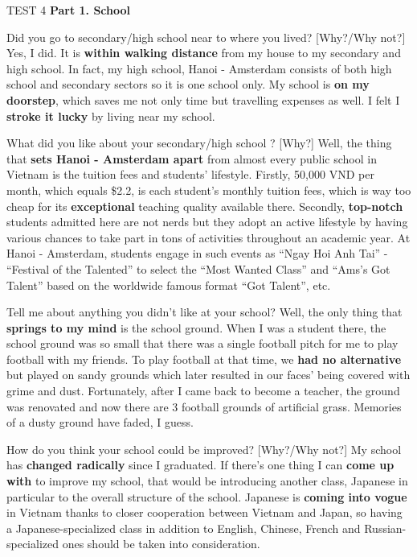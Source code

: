 \begin{glossarymc}[Cambridge 10]
    \begin{test}{TEST 4}
    \noindent
    \textbf{Part 1. School}
    \begin{qa}{Did you go to secondary/high school near to where you lived? [Why?/Why not?]}
    Yes, I did. It is \textbf{within walking distance} from my house to my secondary and high school. In fact, my high school, Hanoi - Amsterdam consists of both high school and secondary sectors so it is one school only. My school is \textbf{on my doorstep}, which saves me not only time but travelling expenses as well. I felt I \textbf{stroke it lucky} by living near my school.
    \end{qa}

    \begin{qa}{What did you like about your secondary/high school ? [Why?]}
    Well, the thing that \textbf{sets Hanoi - Amsterdam apart} from almost every public school in Vietnam is the tuition fees and students' lifestyle. Firstly, 50,000 VND per month, which equals \$2.2, is each student's monthly tuition fees, which is way too cheap for its \textbf{exceptional} teaching quality available there. Secondly, \textbf{top-notch} students admitted here are not nerds but they adopt an active lifestyle by having various chances to take part in tons of activities throughout an academic year. At Hanoi - Amsterdam, students engage in such events as “Ngay Hoi Anh Tai” - “Festival of the Talented” to select the “Most Wanted Class” and “Ams's Got Talent” based on the worldwide famous format “Got Talent”, etc.
    \end{qa}

    \begin{qa}{Tell me about anything you didn't like at your school?}
    Well, the only thing that \textbf{springs to my mind} is the school ground. When I was a student there, the school ground was so small that there was a single football pitch for me to play football with my friends. To play football at that time, we \textbf{had no alternative} but played on sandy grounds which later resulted in our faces' being covered with grime and dust. Fortunately, after I came back to become a teacher, the ground was renovated and now there are 3 football grounds of artificial grass. Memories of a dusty ground have faded, I guess.
    \end{qa}

    \begin{qa}{How do you think your school could be improved? [Why?/Why not?]}
    My school has \textbf{changed radically} since I graduated. If there's one thing I can \textbf{come up with} to improve my school, that would be introducing another class, Japanese in particular to the overall structure of the school. Japanese is \textbf{coming into vogue} in Vietnam thanks to closer cooperation between Vietnam and Japan, so having a Japanese-specialized class in addition to English, Chinese, French and Russian-specialized ones should be taken into consideration.
    \end{qa}


\end{test}
\end{glossarymc}
